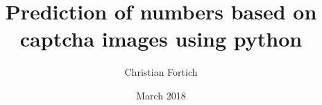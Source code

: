 \documentclass{report}
\title{Prediction of numbers based on captcha images using python}
\author{Christian Fortich}
\date{March 2018}
\begin{document}
\maketitle





\begin{appendices}
    
    
\end{appendices}

\printbibliography
\end{document}
